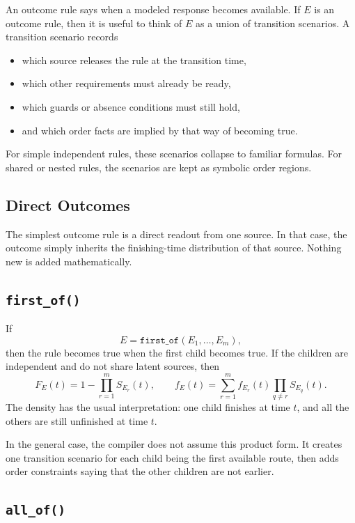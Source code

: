 \documentclass[11pt]{article}
\begin{document}
An outcome rule says when a modeled response becomes available. If $E$ is an
outcome rule, then it is useful to think of $E$ as a union of transition
scenarios. A transition scenario records
\begin{itemize}
  \item which source releases the rule at the transition time,
  \item which other requirements must already be ready,
  \item which guards or absence conditions must still hold,
  \item and which order facts are implied by that way of becoming true.
\end{itemize}

For simple independent rules, these scenarios collapse to familiar formulas.
For shared or nested rules, the scenarios are kept as symbolic order regions.

\subsection{Direct Outcomes}

The simplest outcome rule is a direct readout from one source. In that case,
the outcome simply inherits the finishing-time distribution of that source.
Nothing new is added mathematically.

\subsection{\texttt{first\_of()}}

If
\[
E = \texttt{first\_of}(E_1,\dots,E_m),
\]
then the rule becomes true when the first child becomes true. If the children
are independent and do not share latent sources, then
\begin{equation}
F_E(t) = 1 - \prod_{r=1}^m S_{E_r}(t),
\qquad
f_E(t) = \sum_{r=1}^m f_{E_r}(t)\prod_{q \ne r} S_{E_q}(t).
\label{eq:first-of}
\end{equation}
The density has the usual interpretation: one child finishes at time $t$, and
all the others are still unfinished at time $t$.

In the general case, the compiler does not assume this product form. It creates
one transition scenario for each child being the first available route, then
adds order constraints saying that the other children are not earlier.

\subsection{\texttt{all\_of()}}
\end{document}
